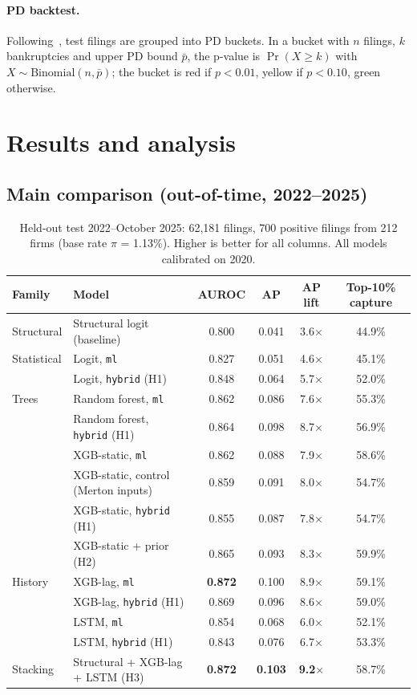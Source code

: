 \paragraph{PD backtest.} Following~\cite{moscatelli2020}, test filings are grouped into PD buckets. In a bucket
with $n$ filings, $k$ bankruptcies and upper PD bound $\bar p$, the p-value is $\Pr(X\ge k)$ with
$X\sim\mathrm{Binomial}(n,\bar p)$; the bucket is red if $p<0.01$, yellow if $p<0.10$, green otherwise.

\section{Results and analysis}
\label{sec:results}

\subsection{Main comparison (out-of-time, 2022--2025)}

\begin{table}[htbp]
\centering
\small
\begin{tabular}{llcccc}
\toprule
Family & Model & AUROC & AP & AP lift & Top-10\% capture \\
\midrule
Structural & Structural logit (baseline) & 0.800 & 0.041 & 3.6$\times$ & 44.9\% \\
\midrule
Statistical & Logit, \texttt{ml} & 0.827 & 0.051 & 4.6$\times$ & 45.1\% \\
            & Logit, \texttt{hybrid} (H1) & 0.848 & 0.064 & 5.7$\times$ & 52.0\% \\
\midrule
Trees & Random forest, \texttt{ml} & 0.862 & 0.086 & 7.6$\times$ & 55.3\% \\
      & Random forest, \texttt{hybrid} (H1) & 0.864 & 0.098 & 8.7$\times$ & 56.9\% \\
      & XGB-static, \texttt{ml} & 0.862 & 0.088 & 7.9$\times$ & 58.6\% \\
      & XGB-static, control (Merton inputs) & 0.859 & 0.091 & 8.0$\times$ & 54.7\% \\
      & XGB-static, \texttt{hybrid} (H1) & 0.855 & 0.087 & 7.8$\times$ & 54.7\% \\
      & XGB-static + prior (H2) & 0.865 & 0.093 & 8.3$\times$ & 59.9\% \\
\midrule
History & XGB-lag, \texttt{ml} & \textbf{0.872} & 0.100 & 8.9$\times$ & 59.1\% \\
        & XGB-lag, \texttt{hybrid} (H1) & 0.869 & 0.096 & 8.6$\times$ & 59.0\% \\
        & LSTM, \texttt{ml} & 0.854 & 0.068 & 6.0$\times$ & 52.1\% \\
        & LSTM, \texttt{hybrid} (H1) & 0.843 & 0.076 & 6.7$\times$ & 53.3\% \\
\midrule
Stacking & Structural + XGB-lag + LSTM (H3) & \textbf{0.872} & \textbf{0.103} & \textbf{9.2}$\times$ & 58.7\% \\
\bottomrule
\end{tabular}
\caption{Held-out test 2022--October 2025: 62,181 filings, 700 positive filings from 212 firms (base rate
$\pi$ = 1.13\%). Higher is better for all columns. All models calibrated on 2020.}
\label{tab:results}
\end{table}

